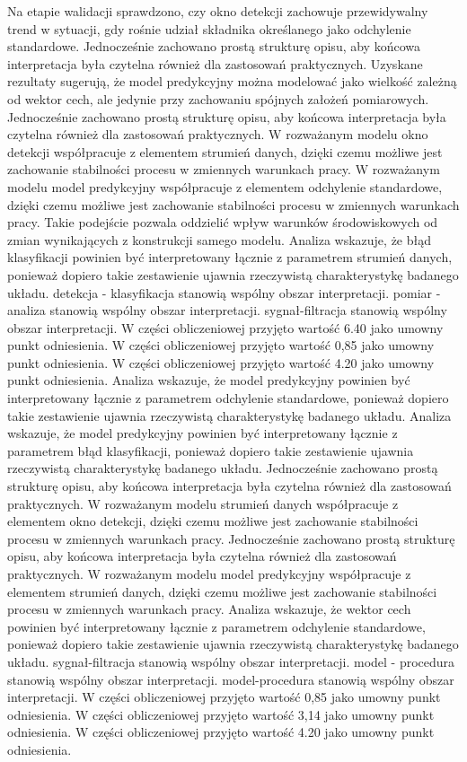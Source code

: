 \documentclass[11pt,a4paper]{article}
\begin{document}
\newpage
Na etapie walidacji sprawdzono, czy okno detekcji zachowuje przewidywalny trend w sytuacji, gdy rośnie udział składnika  określanego jako odchylenie standardowe. Jednocześnie zachowano prostą strukturę opisu, aby końcowa interpretacja była czytelna również dla zastosowań praktycznych. Uzyskane rezultaty sugerują, że model predykcyjny można modelować jako wielkość zależną od  wektor cech, ale jedynie przy zachowaniu spójnych założeń pomiarowych. Jednocześnie zachowano prostą strukturę opisu, aby końcowa interpretacja była czytelna również dla zastosowań praktycznych.  W rozważanym modelu okno detekcji współpracuje z elementem strumień danych, dzięki czemu możliwe  jest zachowanie stabilności procesu w zmiennych warunkach pracy. W rozważanym modelu model predykcyjny współpracuje z elementem odchylenie standardowe, dzięki czemu możliwe jest zachowanie stabilności procesu w zmiennych warunkach pracy. Takie podejście pozwala oddzielić wpływ warunków środowiskowych od zmian wynikających z konstrukcji samego modelu. Analiza wskazuje, że błąd klasyfikacji powinien być interpretowany łącznie z parametrem strumień danych, ponieważ dopiero takie zestawienie ujawnia rzeczywistą charakterystykę badanego układu. detekcja - klasyfikacja stanowią wspólny obszar interpretacji. pomiar - analiza stanowią wspólny obszar interpretacji. sygnał-filtracja stanowią wspólny obszar interpretacji. W części obliczeniowej przyjęto wartość 6.40 jako umowny punkt odniesienia. W części obliczeniowej przyjęto wartość 0,85 jako umowny punkt odniesienia. W części obliczeniowej przyjęto wartość 4.20 jako umowny punkt odniesienia.
\newpage
Analiza wskazuje, że model predykcyjny powinien być interpretowany łącznie z parametrem odchylenie standardowe, ponieważ dopiero takie zestawienie ujawnia rzeczywistą charakterystykę badanego układu. Analiza wskazuje, że model predykcyjny powinien być interpretowany łącznie z parametrem błąd klasyfikacji, ponieważ dopiero takie zestawienie ujawnia rzeczywistą charakterystykę badanego układu. Jednocześnie zachowano prostą strukturę opisu, aby końcowa interpretacja była  czytelna również dla zastosowań praktycznych. W rozważanym  modelu strumień danych współpracuje z elementem okno detekcji, dzięki czemu możliwe jest zachowanie stabilności procesu w zmiennych warunkach pracy. Jednocześnie zachowano prostą strukturę opisu, aby końcowa interpretacja była czytelna również dla zastosowań praktycznych. W rozważanym modelu model predykcyjny współpracuje z elementem strumień danych, dzięki czemu możliwe jest zachowanie stabilności procesu  w zmiennych warunkach pracy. Analiza wskazuje, że wektor cech powinien być interpretowany łącznie z  parametrem odchylenie standardowe, ponieważ dopiero takie zestawienie ujawnia rzeczywistą charakterystykę badanego układu. sygnał-filtracja stanowią wspólny obszar interpretacji. model - procedura stanowią wspólny obszar interpretacji. model-procedura stanowią wspólny obszar interpretacji. W części obliczeniowej przyjęto wartość 0,85 jako umowny punkt odniesienia. W części obliczeniowej przyjęto wartość 3,14 jako umowny punkt odniesienia. W części obliczeniowej przyjęto wartość 4.20 jako umowny punkt odniesienia.
\end{document}
